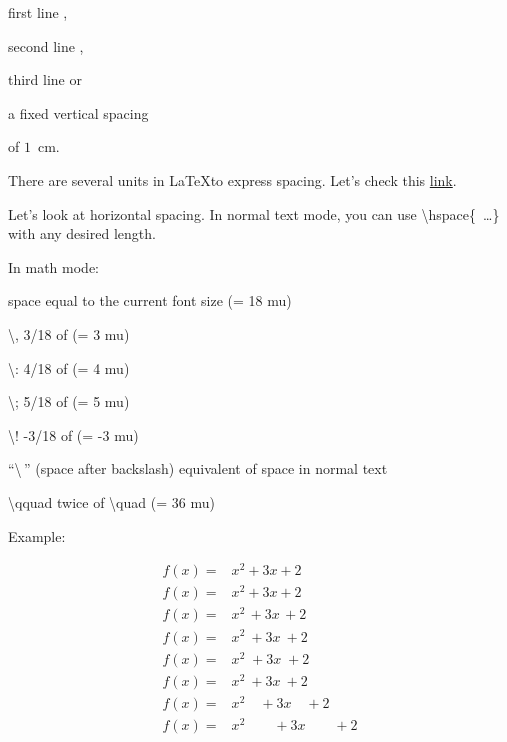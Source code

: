\documentclass{article}
\begin{document}
first line \smallskip,

second line \medskip, 

third line \bigskip or

a fixed vertical spacing \vspace{1cm}

of $1$~cm. %

\vspace{0.5cm}

There are several units in \LaTeX to express spacing. Let's check this \href{https://www.overleaf.com/learn/latex/Lengths_in_LaTeX}{link}.

\vspace{\baselineskip}

Let's look at horizontal spacing. In normal text mode, you can use \mbox{\textbackslash hspace\{ \dots \}} with any desired length. 

In math mode:

\quad	space equal to the current font size (= 18 mu)

\textbackslash,	3/18 of \quad (= 3 mu)

\textbackslash:	4/18 of \quad (= 4 mu)

\textbackslash;	5/18 of \quad (= 5 mu)

\textbackslash!	-3/18 of \quad (= -3 mu)

``\textbackslash \,'' (space after backslash)	equivalent of space in normal text

\textbackslash qquad	twice of \textbackslash quad (= 36 mu)

\vspace{\baselineskip}

Example:

\begin{align}\label{SpacingExample}
f(x) =& x^2\! +3x\! +2 \\
f(x) =& x^2+3x+2 \\
f(x) =& x^2\, +3x\, +2 \\
f(x) =& x^2\: +3x\: +2 \\
f(x) =& x^2\; +3x\; +2 \\
f(x) =& x^2\ +3x\ +2 \\
f(x) =& x^2\quad +3x\quad +2 \\
f(x) =& x^2\qquad +3x\qquad +2
\end{align}
\end{document}

